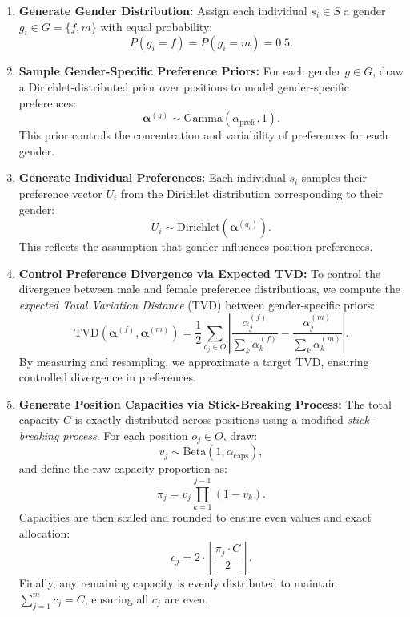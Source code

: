 \documentclass[letterpaper]{article}
\begin{document}
\begin{enumerate}
    \item \textbf{Generate Gender Distribution:}  
    Assign each individual \( s_i \in S \) a gender \( g_i \in G = \{f, m\} \) with equal probability:
    \[
    P(g_i = f) = P(g_i = m) = 0.5.
    \]

    \item \textbf{Sample Gender-Specific Preference Priors:}  
    For each gender \( g \in G \), draw a Dirichlet-distributed prior over positions to model gender-specific preferences:
    \[
    \boldsymbol{\alpha}^{(g)} \sim \text{Gamma}(\alpha_\text{prefs}, 1).
    \]
    This prior controls the concentration and variability of preferences for each gender.

    \item \textbf{Generate Individual Preferences:}  
    Each individual \( s_i \) samples their preference vector \( U_i \) from the Dirichlet distribution corresponding to their gender:
    \[
    U_i \sim \text{Dirichlet}(\boldsymbol{\alpha}^{(g_i)}).
    \]
    This reflects the assumption that gender influences position preferences.

    \item \textbf{Control Preference Divergence via Expected TVD:}  
    To control the divergence between male and female preference distributions, we compute the \textit{expected Total Variation Distance} (TVD) between gender-specific priors:
    \[
    \text{TVD}(\boldsymbol{\alpha}^{(f)}, \boldsymbol{\alpha}^{(m)}) = \frac{1}{2} \sum_{o_j \in O} \left| \frac{\alpha^{(f)}_j}{\sum_{k} \alpha^{(f)}_k} - \frac{\alpha^{(m)}_j}{\sum_{k} \alpha^{(m)}_k} \right|.
    \]
    By measuring and resampling, we approximate a target TVD, ensuring controlled divergence in preferences.

    \item \textbf{Generate Position Capacities via Stick-Breaking Process:}  
    The total capacity \( C \) is exactly distributed across positions using a modified \textit{stick-breaking process}. For each position \( o_j \in O \), draw:
    \[
    v_j \sim \text{Beta}(1, \alpha_\text{caps}),
    \]
    and define the raw capacity proportion as:
    \[
    \pi_j = v_j \prod_{k=1}^{j-1} (1 - v_k).
    \]
    Capacities are then scaled and rounded to ensure even values and exact allocation:
    \[
    c_j = 2 \cdot \left\lfloor \frac{\pi_j \cdot C}{2} \right\rfloor.
    \]
    Finally, any remaining capacity is evenly distributed to maintain \( \sum_{j=1}^m c_j = C \), ensuring all \( c_j \) are even.
\end{enumerate}
\end{document}
